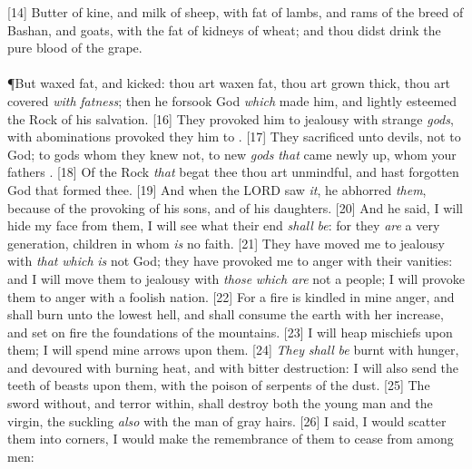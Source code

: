 [14] \textcolor[cmyk]{0.99998,1,0,0}{Butter of kine, and milk of sheep, with fat of lambs, and rams of the breed of Bashan, and goats, with the fat of kidneys of wheat; and thou didst drink the pure blood of the grape.}\\
\\
\P \textcolor[cmyk]{0.99998,1,0,0}{But  waxed fat, and kicked: thou art waxen fat, thou art grown thick, thou art covered \emph{with} \emph{fatness}; then he forsook God \emph{which} made him, and lightly esteemed the Rock of his salvation.}
[16] \textcolor[cmyk]{0.99998,1,0,0}{They provoked him to jealousy with strange \emph{gods}, with abominations provoked they him to .}
[17] \textcolor[cmyk]{0.99998,1,0,0}{They sacrificed unto devils, not to God; to gods whom they knew not, to new \emph{gods} \emph{that} came newly up, whom your fathers .}
[18] \textcolor[cmyk]{0.99998,1,0,0}{Of the Rock \emph{that} begat thee thou art unmindful, and hast forgotten God that formed thee.}
[19] \textcolor[cmyk]{0.99998,1,0,0}{And when the LORD saw \emph{it}, he abhorred \emph{them}, because of the provoking of his sons, and of his daughters.}
[20] \textcolor[cmyk]{0.99998,1,0,0}{And he said, I will hide my face from them, I will see what their end \emph{shall} \emph{be}: for they \emph{are} a very  generation, children in whom \emph{is} no faith.}
[21] \textcolor[cmyk]{0.99998,1,0,0}{They have moved me to jealousy with \emph{that} \emph{which} \emph{is} not God; they have provoked me to anger with their vanities: and I will move them to jealousy with \emph{those} \emph{which} \emph{are} not a people; I will provoke them to anger with a foolish nation.}
[22] \textcolor[cmyk]{0.99998,1,0,0}{For a fire is kindled in mine anger, and shall burn unto the lowest hell, and shall consume the earth with her increase, and set on fire the foundations of the mountains.}
[23] \textcolor[cmyk]{0.99998,1,0,0}{I will heap mischiefs upon them; I will spend mine arrows upon them.}
[24] \textcolor[cmyk]{0.99998,1,0,0}{\emph{They} \emph{shall} \emph{be} burnt with hunger, and devoured with burning heat, and with bitter destruction: I will also send the teeth of beasts upon them, with the poison of serpents of the dust.}
[25] \textcolor[cmyk]{0.99998,1,0,0}{The sword without, and terror within, shall destroy both the young man and the virgin, the suckling \emph{also} with the man of gray hairs.}
[26] \textcolor[cmyk]{0.99998,1,0,0}{I said, I would scatter them into corners, I would make the remembrance of them to cease from among men:}
